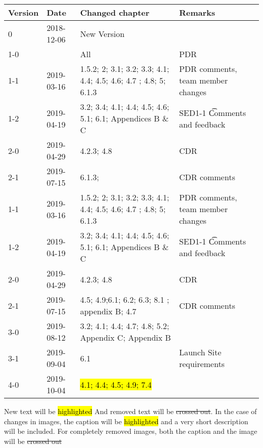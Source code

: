 \begin{longtable}{|p{1.5cm}|p{2cm}|p{6cm}|p{3cm}|}\hline
\centering
\textbf{Version} & \textbf{Date} & \textbf{Changed chapter} & \textbf{Remarks}  \\\hline
0       & 2018-12-06        & New Version                                                           &                                       \\\hline
1-0     &                   & All                                                                   & PDR                                   \\\hline
1-1     & 2019-03-16        & 1.5.2; 2; 3.1; 3.2; 3.3; 4.1; 4.4; 4.5; 4.6; 4.7 ; 4.8; 5; 6.1.3      & PDR comments, team member changes     \\\hline
1-2     & 2019-04-19        & 3.2; 3.4; 4.1; 4.4; 4.5; 4.6; 5.1; 6.1; Appendices B \& C             & SED1-1 \t Comments and feedback       \\\hline
2-0     & 2019-04-29        & 4.2.3; 4.8                                                            & CDR                                   \\\hline
2-1 & 2019-07-15   & 6.1.3;                                                          & CDR comments                     \\\hline

1-1		& 2019-03-16	& 1.5.2; 2; 3.1; 3.2; 3.3; 4.1; 4.4; 4.5; 4.6; 4.7 ; 4.8; 5; 6.1.3		& PDR comments, team member changes 			\\\hline
1-2		& 2019-04-19 	& 3.2; 3.4; 4.1; 4.4; 4.5; 4.6; 5.1; 6.1; Appendices B \& C 			& SED1-1 \t Comments and feedback \\\hline
2-0 & 2019-04-29 & 4.2.3; 4.8													& CDR \\\hline
2-1 & 2019-07-15 & 4.5; 4.9;6.1; 6.2; 6.3; 8.1 ; appendix B; 4.7												& CDR comments \\\hline
3-0 & 2019-08-12 & 3.2; 4.1; 4.4; 4.7; 4.8; 5.2; Appendix C; Appendix B & \\\hline
3-1 & 2019-09-04 & 6.1& Launch Site requirements \\\hline
4-0 & 2019-10-04 & \hl{4.1; 4.4; 4.5; 4.9; 7.4} & \\\hline
\end{longtable}       

New text will be \hl{highlighted} And removed text will be \st{crossed out}. In the case of changes in images, the caption will be \hl{highlighted} and a very short description will be included. For completely removed images, both the caption and the image will be \st{crossed out} 
